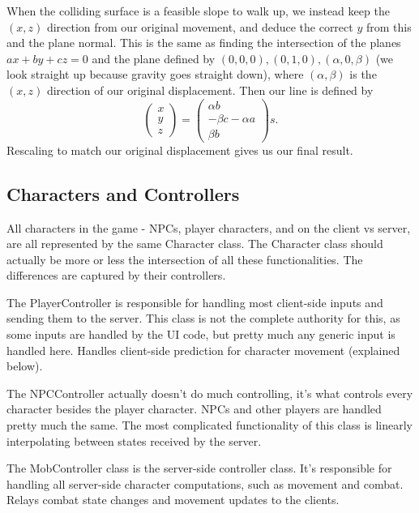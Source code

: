 \documentclass{article}
\begin{document}
When the colliding surface is a feasible slope to walk up, we instead keep
the $(x, z)$ direction from our original movement, and deduce the correct
$y$ from this and the plane normal. This is the same as finding the
intersection of the planes $ax + by + cz = 0$ and the plane defined by
$(0, 0, 0), (0, 1, 0), (\alpha, 0, \beta)$ (we look straight up because gravity goes
straight down), where $(\alpha, \beta)$ is the $(x, z)$ direction of our
original displacement. Then our line is defined by
\[
\begin{pmatrix}
    x\\y\\z
\end{pmatrix} = 
\begin{pmatrix}
    \alpha b\\-\beta c - \alpha a\\\beta b
\end{pmatrix}s.\]
Rescaling to match our original displacement gives us our final result.
\subsection{Characters and Controllers}
All characters in the game - NPCs, player characters, and on the client vs server,
are all represented by the same Character class. The Character class should actually
be more or less the intersection of all these functionalities. The differences
are captured by their controllers.

The PlayerController is responsible for handling most client-side inputs
and sending them to the server. This class is not the complete authority
for this, as some inputs are handled by the UI code, but pretty much any
generic input is handled here. Handles client-side prediction for character
movement (explained below).

The NPCController actually doesn't do much controlling, it's what controls
every character besides the player character. NPCs and other players are handled
pretty much the same. The most complicated functionality of this class is
linearly interpolating between states received by the server.

The MobController class is the server-side controller class. It's responsible
for handling all server-side character computations, such as movement and
combat. Relays combat state changes and movement updates to the clients.
\end{document}
